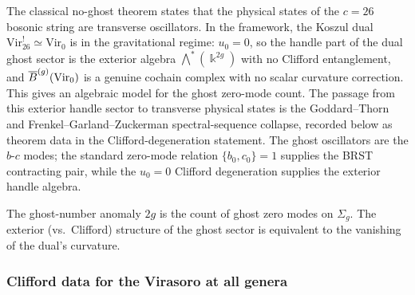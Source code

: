 \begin{remark}
The classical no-ghost theorem states that the physical states of the
$c = 26$ bosonic string are transverse oscillators. In the
framework, the Koszul dual $\mathrm{Vir}_{26}^! \simeq \mathrm{Vir}_0$
is in the gravitational regime: $u_0 = 0$, so the handle part of the
dual ghost sector is the exterior algebra
$\bigwedge^*(\Bbbk^{2g})$ with no Clifford entanglement, and
$\overline{B}^{(g)}(\mathrm{Vir}_0)$ is a genuine cochain complex with no
scalar curvature correction. This gives an algebraic model for the
ghost zero-mode count. The passage from this exterior handle sector to
transverse physical states is the Goddard--Thorn and
Frenkel--Garland--Zuckerman spectral-sequence collapse, recorded below
as theorem data in the Clifford-degeneration statement. The ghost
oscillators are the $b$-$c$ modes; the standard zero-mode relation
$\{b_0,c_0\}=1$ supplies the BRST contracting pair, while the
$u_0=0$ Clifford degeneration supplies the exterior handle algebra.

The ghost-number anomaly $2g$ is the count of ghost zero modes
on $\Sigma_g$. The exterior (vs.\ Clifford) structure of the ghost
sector is equivalent to the vanishing of the dual's curvature.
\end{remark}

\subsubsection{Clifford data for the Virasoro at all genera}

